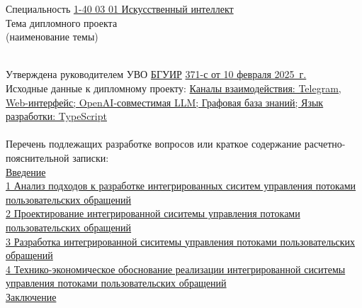 {\begin{center}
  Специальность \uline{1-40 03 01 Искусственный интеллект}\lineunderscore\\[0.5em]

  Тема дипломного проекта \uline{\topicName}\lineunderscore \\
  {\footnotesize\hspace{15em}(наименование темы)}\\[-0.5em]
  \lineunderscore\\[0.5em]
  \end{center}

  Утверждена руководителем УВО \uline{БГУИР} \textnumero  \uline{371-с от 10 февраля 2025~г.}\lineunderscore\\[-0.5em]
  
  Исходные данные к дипломному проекту: \uline{Каналы взаимодействия: Telegram, Web-интерфейс; OpenAI-совместимая LLM; Графовая база знаний; Язык разработки: TypeScript}\lineunderscore\\[0.5em]
  \lineunderscore\\
  
  Перечень подлежащих разработке вопросов или краткое содержание расчетно-пояснительной записки: 
  \lineunderscore\\
  \uline{Введение}\lineunderscore\\
  \uline{1 Анализ подходов к разработке интегрированных сиситем управления потоками пользовательских обращений}\lineunderscore\\
  \uline{2 Проектирование интегрированной сиситемы управления потоками пользовательских обращений}\lineunderscore\\
  \uline{3 Разработка интегрированной сиситемы управления потоками пользовательских обращений}\lineunderscore\\
  \uline{4 Технико-экономическое обоснование реализации интегрированной сиситемы управления потоками пользовательских обращений}\lineunderscore\\
  \uline{Заключение}\lineunderscore\\

}
